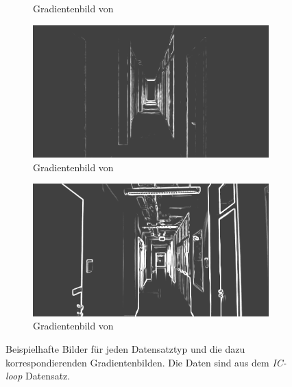 \begin{figure}[H]
\begin{subfigure}[t]{0.24\linewidth}
		\caption{Gradientenbild  \hspace{1cm} von }
	\end{subfigure}
	\hfill
	\begin{subfigure}[t]{0.24\linewidth}
		\centering
		\includegraphics[width=\linewidth]{images/syn_dataset/cg00708.png}
		\caption{Gradientenbild  \hspace{1cm} von }
	\end{subfigure}
	\hfill
	\begin{subfigure}[t]{0.24\linewidth}
		\centering
		\includegraphics[width=\linewidth]{images/syn_dataset/rg000305.png}
		\caption{Gradientenbild  \hspace{1cm} von }
	\end{subfigure}
	\hfill
	\caption{Beispielhafte Bilder für jeden Datensatztyp und die dazu korrespondierenden Gradientenbilden. Die Daten sind aus dem \textit{IC-loop} Datensatz.}
	\label{fig:dataset_preprocess}
\end{figure}

\cleardoublepage

